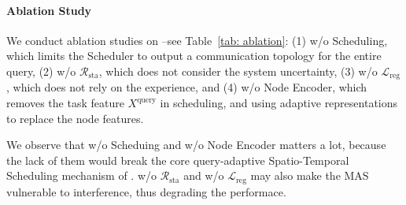 \paragraph{Ablation Study} We conduct ablation studies on \ourmethod--see Table~\ref{tab: ablation}: (1) w/o Scheduling, which limits the Scheduler to output a communication topology for the entire query, (2) w/o $\mathcal{R}_{\text{sta}}$, which does not consider the system uncertainty, (3) w/o $\mathcal{L}_{\text{reg}}$, which does not rely on the experience, and (4) w/o Node Encoder, which removes the task feature $X^{\text{query}}$ in scheduling, and using adaptive representations to replace the node features.

\begin{table}[!htbp]
\centering
{}
\caption{Ablation study tested on MMLU, HumanEval, SVAMP, and GSM8K benchmarks.}
\label{tab: ablation}
\vspace{-2mm}
\end{table}
We observe that w/o Scheduing and w/o Node Encoder matters a lot, because the lack of them would break the core query-adaptive Spatio-Temporal Scheduling mechanism of \ourmethod. w/o $\mathcal{R}_{\text{sta}}$ and w/o $\mathcal{L}_{\text{reg}}$ may also make the MAS vulnerable to interference, thus degrading the performace.


